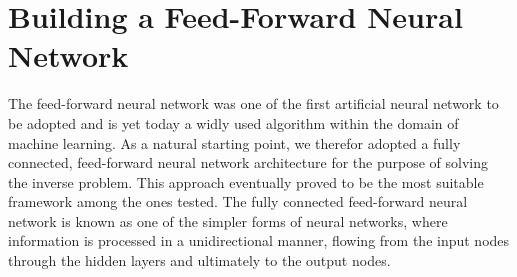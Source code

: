 \documentclass[a4paper, UKenglish, 11pt]{uiomaster}
\begin{document}
%
%
%


\section{Building a Feed-Forward Neural Network}
The feed-forward neural network was one of the first artificial neural network to be adopted and is yet today a widly used algorithm within the domain of machine learning. As a natural starting point, we therefor adopted a fully connected, feed-forward neural network architecture for the purpose of solving the inverse problem. This approach eventually proved to be the most suitable framework among the ones tested. The fully connected feed-forward neural network is known as one of the simpler forms of neural networks, where information is processed in a unidirectional manner, flowing from the input nodes through the hidden layers and ultimately to the output nodes.
\end{document}
